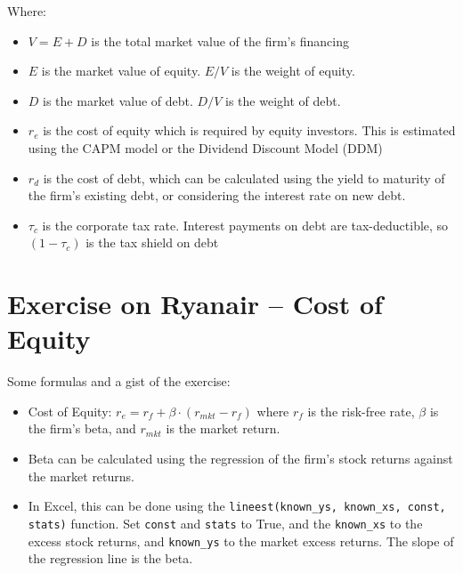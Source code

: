 Where:
\begin{itemize}
    \item $V = E + D$ is the total market value of the firm's financing
    \item $E$ is the market value of equity. $E/V$ is the weight of equity.
    \item $D$ is the market value of debt. $D/V$ is the weight of debt.
    \item $r_e$ is the cost of equity which is required by equity investors. This is estimated using the CAPM model or the Dividend Discount Model (DDM)
    \item $r_d$ is the cost of debt, which can be calculated using the yield to maturity of the firm's existing debt, or considering the interest rate on new debt.
    \item $\tau_c$ is the corporate tax rate. Interest payments on debt are tax-deductible, so $(1 - \tau_c)$ is the tax shield on debt
\end{itemize}

\section{Exercise on Ryanair – Cost of Equity}
Some formulas and a gist of the exercise:
\begin{itemize}
    \item Cost of Equity: $r_e = r_f + \beta \cdot (r_{mkt} - r_f)$ where $r_f$ is the risk-free rate, $\beta$ is the firm's beta, and $r_{mkt}$ is the market return.
    \item Beta can be calculated using the regression of the firm's stock returns against the market returns. 
    \item In Excel, this can be done using the \texttt{lineest(known\_ys, known\_xs, const, stats)} function. Set \texttt{const} and \texttt{stats} to True, and the \texttt{known\_xs} to the excess stock returns, and \texttt{known\_ys} to the market excess returns. The slope of the regression line is the beta.
\end{itemize}

